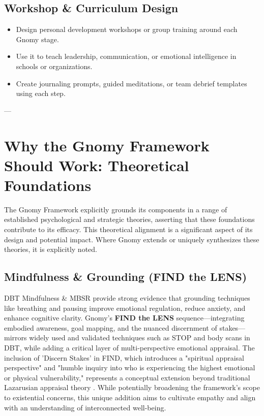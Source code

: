 \documentclass{article}
\begin{document}
\subsection{Workshop \& Curriculum Design}
\begin{itemize}[noitemsep,topsep=0pt]
    \item Design personal development workshops or group training around each Gnomy stage.
    \item Use it to teach leadership, communication, or emotional intelligence in schools or organizations.
    \item Create journaling prompts, guided meditations, or team debrief templates using each step.
\end{itemize}

---

\section{Why the Gnomy Framework Should Work: Theoretical Foundations}
The Gnomy Framework explicitly grounds its components in a range of established psychological and strategic theories, asserting that these foundations contribute to its efficacy. This theoretical alignment is a significant aspect of its design and potential impact. Where Gnomy extends or uniquely synthesizes these theories, it is explicitly noted.

\subsection{Mindfulness \& Grounding (FIND the LENS)}
DBT Mindfulness \cite{linehan1993cognitive} \& MBSR \cite{kabat1990full} provide strong evidence that grounding techniques like breathing and pausing improve emotional regulation, reduce anxiety, and enhance cognitive clarity. Gnomy's \textbf{FIND the LENS} sequence—integrating embodied awareness, goal mapping, and the nuanced discernment of stakes—mirrors widely used and validated techniques such as STOP and body scans in DBT, while adding a critical layer of multi-perspective emotional appraisal. The inclusion of 'Discern Stakes' in FIND, which introduces a "spiritual appraisal perspective" and "humble inquiry into who is experiencing the highest emotional or physical vulnerability," represents a conceptual extension beyond traditional Lazarusian appraisal theory \cite{lazarus1984stress}. While potentially broadening the framework's scope to existential concerns, this unique addition aims to cultivate empathy and align with an understanding of interconnected well-being.
\end{document}
